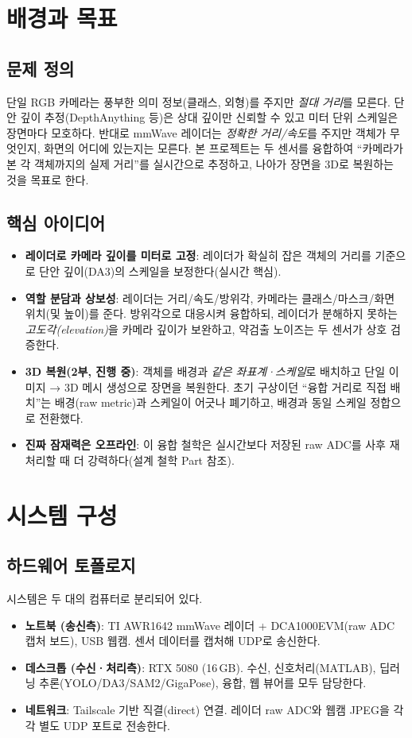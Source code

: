 \chapter{배경과 목표}

\section{문제 정의}
단일 RGB 카메라는 풍부한 의미 정보(클래스, 외형)를 주지만 \emph{절대 거리}를 모른다.
단안 깊이 추정(DepthAnything 등)은 상대 깊이만 신뢰할 수 있고 미터 단위 스케일은
장면마다 모호하다. 반대로 mmWave 레이더는 \emph{정확한 거리/속도}를 주지만 객체가
무엇인지, 화면의 어디에 있는지는 모른다. 본 프로젝트는 두 센서를 융합하여
``카메라가 본 각 객체까지의 실제 거리''를 실시간으로 추정하고, 나아가 장면을
3D로 복원하는 것을 목표로 한다.

\section{핵심 아이디어}
\begin{itemize}
  \item \textbf{레이더로 카메라 깊이를 미터로 고정}: 레이더가 확실히 잡은 객체의
        거리를 기준으로 단안 깊이(DA3)의 스케일을 보정한다(실시간 핵심).
  \item \textbf{역할 분담과 상보성}: 레이더는 거리/속도/방위각, 카메라는
        클래스/마스크/화면 위치(및 높이)를 준다. 방위각으로 대응시켜 융합하되,
        레이더가 분해하지 못하는 \emph{고도각(elevation)}을 카메라 깊이가 보완하고,
        약검출 노이즈는 두 센서가 상호 검증한다.
  \item \textbf{3D 복원(2부, 진행 중)}: 객체를 배경과 \emph{같은 좌표계·스케일}로
        배치하고 단일 이미지 → 3D 메시 생성으로 장면을 복원한다. 초기 구상이던
        ``융합 거리로 직접 배치''는 배경(raw metric)과 스케일이 어긋나 폐기하고,
        배경과 동일 스케일 정합으로 전환했다.
  \item \textbf{진짜 잠재력은 오프라인}: 이 융합 철학은 실시간보다 저장된 raw ADC를
        사후 재처리할 때 더 강력하다(설계 철학 Part 참조).
\end{itemize}

\chapter{시스템 구성}

\section{하드웨어 토폴로지}
시스템은 두 대의 컴퓨터로 분리되어 있다.
\begin{itemize}
  \item \textbf{노트북 (송신측)}: TI AWR1642 mmWave 레이더 + DCA1000EVM(raw ADC 캡처
        보드), USB 웹캠. 센서 데이터를 캡처해 UDP로 송신한다.
  \item \textbf{데스크톱 (수신·처리측)}: RTX 5080 (16\,GB). 수신, 신호처리(MATLAB),
        딥러닝 추론(YOLO/DA3/SAM2/GigaPose), 융합, 웹 뷰어를 모두 담당한다.
  \item \textbf{네트워크}: Tailscale 기반 직결(direct) 연결. 레이더 raw ADC와 웹캠
        JPEG을 각각 별도 UDP 포트로 전송한다.
\end{itemize}

